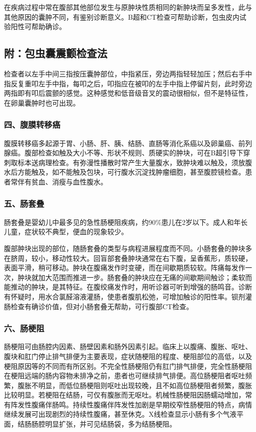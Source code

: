 在疾病过程中常在腹部其他部位发生与原肿块性质相同的新肿块而呈多发性，此与其他原因的囊肿不同，有鉴别诊断意义。B超和CT检查可帮助诊断，包虫皮内试验阳性可帮助确诊。

\subsection{附：包虫囊震颤检查法}

检查者以左手中间三指按压囊肿部位，中指紧压，旁边两指轻轻加压；然后右手中指反复重叩左手中指，每叩之后，叩指应在被叩的左手中指上停留片刻，此时旁边两指即有叩后震颤的感觉。这种感觉和低音级音叉的震动很相似，但不是特征性，在卵巢囊肿时也可出现。

\subsubsection{四、腹膜转移癌}

腹膜转移癌多起源于胃、小肠、肝、胰、结肠、直肠等消化系癌以及卵巢癌、前列腺癌。腹部检查如触及大小不等、形状不规则、质硬实的肿块，可在B超引导下穿刺取标本送病理检查。有弥漫性播散时常产生大量腹水，致肿块难以触及，须放腹水后方能触及，如不能触及包块，可行腹水沉淀找肿瘤细胞，甚至腹腔镜检查。患者常伴有贫血、消瘦与血性腹水。

\subsubsection{五、肠套叠}

肠套叠是婴幼儿中最多见的急性肠梗阻疾病，约90\%患儿在2岁以下。成人和年长儿童，症状较不典型，便血的现象较少。

腹部肿块出现的部位，随肠套叠的类型与病程进展程度而不同。小肠套叠的肿块多在脐周，较小，移动性较大。回盲部套叠肿块通常在右下腹，呈香蕉形，质较硬，表面平滑，稍可移动。肿块在腹痛发作时变硬，而在间歇期质较软。阵痛每发作一次，肿块就加大范围而推进一步。肠套叠的肿块应在无痛的间歇期间触诊；柔软而能推动的肿块，是其特征。在腹绞痛发作时，用听诊器可听到增强的肠鸣音。诊断有怀疑时，用水合氯醛溶液灌肠，使患者腹肌松弛，可增加触诊的阳性率。钡剂灌肠检查有确诊价值，但对小肠套叠无帮助，可行腹部CT检查。

\subsubsection{六、肠梗阻}

肠梗阻可由肠腔内因素、肠壁因素和肠外因素引起。临床上以腹痛、腹胀、呕吐、腹块和肛门停止排气排便为主要表现，症状随梗阻的程度、梗阻部位的高低，以及梗阻原因等的不同而有所区别。不完全性肠梗阻仍有肛门排气排便，完全性肠梗阻在梗阻远端的肠内容物未排净之前，患者也可继续排气排便。高位肠梗阻者呕吐频繁，腹胀不明显，而低位肠梗阻则呕吐出现较晚，且不如高位肠梗阻者频繁，腹胀比较明显。若梗阻在结肠，可仅有腹胀而无呕吐。机械性肠梗阻因肠蠕动增加，常有阵发性腹痛伴肠鸣。持续性腹痛伴阵发性加剧是早期绞窄性肠梗阻的特点，病情继续发展可出现剧烈的持续性腹痛，甚至休克。X线检查显示小肠有多个气液平面，结肠肠腔明显扩张，并可见结肠袋，多为结肠梗阻。

